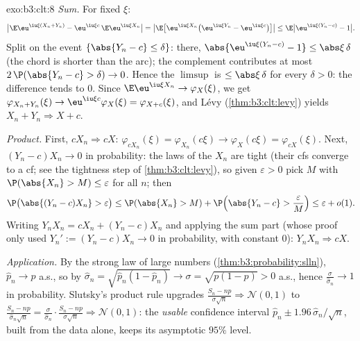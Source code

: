 \begin{solution}{exo:b3:clt:8}
\emph{Sum.} For fixed $\xi$:
\[
\bigl|\E\eu^{\iu\xi(X_n+Y_n)} -
\eu^{\iu\xi c}\,\E\eu^{\iu\xi X_n}\bigr|
= \bigl|\E\bigl[\eu^{\iu\xi X_n}\bigl(\eu^{\iu\xi Y_n} -
\eu^{\iu\xi c}\bigr)\bigr]\bigr|
\leq \E\bigl|\eu^{\iu\xi(Y_n - c)} - 1\bigr| .
\]
Split on the event $\{\abs{Y_n - c} \leq \delta\}$: there,
$\abs{\eu^{\iu\xi(Y_n-c)} - 1} \leq \abs\xi\,\delta$ (the
chord is shorter than the arc); the complement contributes
at most $2\,\P(\abs{Y_n - c} > \delta) \to 0$. Hence the
$\limsup$ is $\leq \abs\xi\,\delta$ for every $\delta > 0$:
the difference tends to $0$. Since $\E\eu^{\iu\xi X_n} \to
\varphi_X(\xi)$, we get $\varphi_{X_n+Y_n}(\xi) \to
\eu^{\iu\xi c}\varphi_X(\xi) = \varphi_{X+c}(\xi)$, and
L\'evy (\cref{thm:b3:clt:levy}) yields $X_n + Y_n
\Rightarrow X + c$.

\emph{Product.} First, $cX_n \Rightarrow cX$:
$\varphi_{cX_n}(\xi) = \varphi_{X_n}(c\xi) \to
\varphi_X(c\xi) = \varphi_{cX}(\xi)$. Next, $(Y_n - c)X_n
\to 0$ in probability: the laws of the $X_n$ are tight (their
cfs converge to a cf; see the tightness step of
\cref{thm:b3:clt:levy}), so given $\varepsilon > 0$ pick $M$
with $\P(\abs{X_n} > M) \leq \varepsilon$ for all $n$; then
\[
\P\bigl(\abs{(Y_n - c)X_n} > \varepsilon\bigr) \leq
\P(\abs{X_n} > M) + \P\Bigl(\abs{Y_n - c} >
\frac{\varepsilon}{M}\Bigr) \leq \varepsilon + o(1) .
\]
Writing $Y_nX_n = cX_n + (Y_n - c)X_n$ and applying the sum
part (whose proof only used $Y_n' := (Y_n - c)X_n \to 0$ in
probability, with constant $0$): $Y_nX_n \Rightarrow cX$.

\emph{Application.} By the strong law of large numbers
(\cref{thm:b3:probability:slln}), $\hat p_n \to p$ a.s., so
by  $\hat\sigma_n = \sqrt{\hat p_n(1 - \hat p_n)}
\to \sigma = \sqrt{p(1 - p)} > 0$ a.s., hence
$\frac{\sigma}{\hat\sigma_n} \to 1$ in probability. Slutsky's
product rule upgrades $\frac{S_n - np}{\sigma\sqrt n}
\Rightarrow \mathcal N(0,1)$ to $\frac{S_n -
np}{\hat\sigma_n\sqrt n} = \frac{\sigma}{\hat\sigma_n}\cdot
\frac{S_n - np}{\sigma\sqrt n} \Rightarrow \mathcal N(0,1)$:
the \emph{usable} confidence interval $\hat p_n \pm
1.96\,\hat\sigma_n/\sqrt n$, built from the data alone,
keeps its asymptotic $95\%$ level.
\end{solution}

